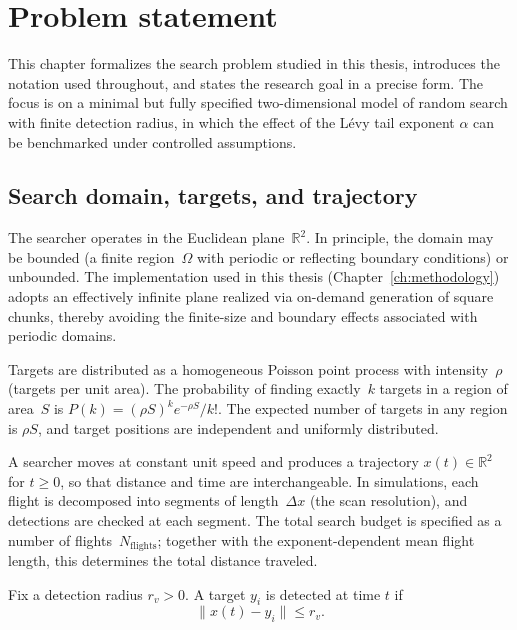 \chapter{Problem statement}
\label{ch:problem_statement}

This chapter formalizes the search problem studied in this thesis, introduces the notation used throughout, and states the research goal in a precise form. The focus is on a minimal but fully specified two-dimensional model of random search with finite detection radius, in which the effect of the Lévy tail exponent $\alpha$ can be benchmarked under controlled assumptions.

\section{Search domain, targets, and trajectory}
The searcher operates in the Euclidean plane~$\mathbb{R}^2$.
In principle, the domain may be bounded (a finite region~$\Omega$ with
periodic or reflecting boundary conditions) or unbounded.  The
implementation used in this thesis (Chapter~\ref{ch:methodology})
adopts an effectively infinite plane realized via on-demand
generation of square chunks, thereby avoiding the finite-size
and boundary effects associated with periodic domains.

Targets are distributed as a homogeneous Poisson point process
with intensity~$\rho$ (targets per unit area).  The probability
of finding exactly~$k$ targets in a region of area~$S$ is
$P(k) = (\rho S)^k e^{-\rho S}/k!$.  The expected number of
targets in any region is $\rho S$, and target positions are
independent and uniformly distributed.

A searcher moves at constant unit speed and produces a
trajectory $x(t)\in\mathbb{R}^2$ for $t\ge 0$, so that
distance and time are interchangeable.
In simulations, each flight is decomposed into segments of
length~$\Delta x$ (the scan resolution), and detections are
checked at each segment.  The total search budget is specified
as a number of flights~$N_{\mathrm{flights}}$; together with the
exponent-dependent mean flight length, this determines the total
distance traveled.

\begin{Def}
Fix a detection radius $r_v>0$. A target $y_i$ is detected at time $t$ if
\begin{equation}
    \|x(t)-y_i\|\le r_v .
    \label{eq:detection_condition}
\end{equation}
\end{Def}

